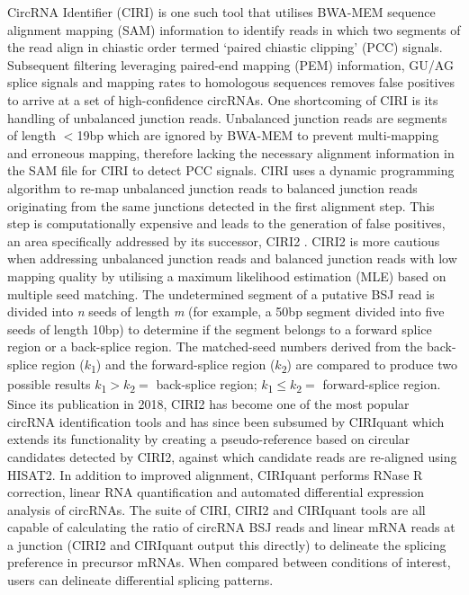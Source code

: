 \documentclass[pdflatex,sn-mathphys-num]{sn-jnl}
\begin{document}
CircRNA Identifier (CIRI) \cite{CIRI} is one such tool that utilises BWA-MEM sequence alignment mapping (SAM) information to identify reads in which two segments of the read align in chiastic order termed `paired chiastic clipping' (PCC) signals. Subsequent filtering leveraging paired-end mapping (PEM) information, GU/AG splice signals and mapping rates to homologous sequences removes false positives to arrive at a set of high-confidence circRNAs. One shortcoming of CIRI is its handling of unbalanced junction reads. Unbalanced junction reads are segments of length $<$19bp which are ignored by BWA-MEM to prevent multi-mapping and erroneous mapping, therefore lacking the necessary alignment information in the SAM file for CIRI to detect PCC signals. CIRI uses a dynamic programming algorithm to re-map unbalanced junction reads to balanced junction reads originating from the same junctions detected in the first alignment step. This step is computationally expensive and leads to the generation of false positives, an area specifically addressed by its successor, CIRI2 \cite{CIRI2}. CIRI2 is more cautious when addressing unbalanced junction reads and balanced junction reads with low mapping quality by utilising a maximum likelihood estimation (MLE) based on multiple seed matching. The undetermined segment of a putative BSJ read is divided into \textit{n} seeds of length \textit{m} (for example, a 50bp segment divided into five seeds of length 10bp) to determine if the segment belongs to a forward splice region or a back-splice region. The matched-seed numbers derived from the back-splice region ($k$\textsubscript{1}) and the forward-splice region ($k$\textsubscript{2}) are compared to produce two possible results $k$\textsubscript{1}$>$$k$\textsubscript{2}$=$ back-splice region; $k$\textsubscript{1}$\leq$$k$\textsubscript{2}$=$ forward-splice region. Since its publication in 2018, CIRI2 has become one of the most popular circRNA identification tools and has since been subsumed by CIRIquant \cite{CIRIquant} which extends its functionality by creating a pseudo-reference based on circular candidates detected by CIRI2, against which candidate reads are re-aligned using HISAT2. In addition to improved alignment, CIRIquant performs RNase R correction, linear RNA quantification and automated differential expression analysis of circRNAs. The suite of CIRI, CIRI2 and CIRIquant tools are all capable of calculating the ratio of circRNA BSJ reads and linear mRNA reads at a junction (CIRI2 and CIRIquant output this directly) to delineate the splicing preference in precursor mRNAs. When compared between conditions of interest, users can delineate differential splicing patterns. \par
\end{document}
